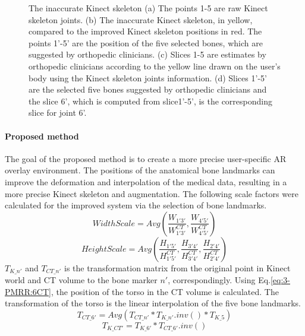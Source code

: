 \begin{figure}
{	}
	\quad
	\caption{The inaccurate Kinect skeleton (a) The points 1-5 are raw Kinect skeleton joints. (b) The inaccurate Kinect skeleton, in yellow, compared to the improved Kinect skeleton positions in red. The points 1'-5' are the position of the five selected bones, which are suggested by orthopedic clinicians. (c) Slices 1-5 are estimates by  orthopedic clinicians according to the yellow line drawn on the user's body using the Kinect skeleton joints information. (d) Slices 1'-5' are the selected five bones suggested by orthopedic clinicians and the slice 6', which is computed from slice1'-5', is the corresponding slice for joint 6'.}
	\label{fig:3-PRMM:5Joints}
\end{figure} 
\paragraph{Proposed method} The goal of the proposed method is to create a more precise user-specific AR overlay environment. The positions of the anatomical bone landmarks can improve the deformation and interpolation of the medical data, resulting in a more precise Kinect skeleton and augmentation. The following scale factors were calculated for the improved system via the selection of bone landmarks. 
\begin{equation}
WidthScale = Avg(\frac{{{W_{1'3'}}}}{{W_{1'3'}^{CT}}},\frac{{{W_{4'5'}}}}{{W_{4'5'}^{CT}}})
\end{equation}
\begin{equation}
HeightScale = Avg(\frac{{{H_{1'5'}}}}{{H_{1'5'}^{CT}}},\frac{{{H_{3'4'}}}}{{H_{3'4'}^{CT}}},\frac{{{H_{2'4'}}}}{{H_{2'4'}^{CT}}})
\end{equation}
$T_{K\_n'}$ and $T_{CT\_n'}$ is the transformation matrix from the original point in Kinect world and CT volume to the bone marker $n'$, correspondingly. Using Eq.\ref{eq:3-PMRR:6CT}, the position of the torso in the CT volume is calculated. The transformation of the torso is the linear interpolation of the five bone landmarks.
\begin{equation} \label{eq:3-PMRR:6CT}
T_{CT\_6'} = Avg(T_{CT\_n'} * T_{K\_n'}.inv() * T_{K\_5 })
\end{equation}
\begin{equation}
T_{K\_CT'} = T_{K\_6'} * T_{CT\_6'}.inv()
\end{equation}

